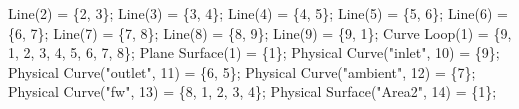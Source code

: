 \documentclass[11pt]{article}
\newenvironment{Shaded}{}{}
\newcommand{\DecValTok}[1]{\textcolor[rgb]{0.25,0.63,0.44}{{#1}}}
\newcommand{\StringTok}[1]{\textcolor[rgb]{0.25,0.44,0.63}{{#1}}}
\newcommand{\NormalTok}[1]{{#1}}
\newcommand{\OperatorTok}[1]{\textcolor[rgb]{0.40,0.40,0.40}{{#1}}}
\begin{document}
\begin{Shaded}
\begin{Highlighting}[]
\NormalTok{Line}\OperatorTok{(}\DecValTok{2}\OperatorTok{)} \OperatorTok{=} \OperatorTok{\{}\DecValTok{2}\OperatorTok{,} \DecValTok{3}\OperatorTok{\};}
\NormalTok{Line}\OperatorTok{(}\DecValTok{3}\OperatorTok{)} \OperatorTok{=} \OperatorTok{\{}\DecValTok{3}\OperatorTok{,} \DecValTok{4}\OperatorTok{\};}
\NormalTok{Line}\OperatorTok{(}\DecValTok{4}\OperatorTok{)} \OperatorTok{=} \OperatorTok{\{}\DecValTok{4}\OperatorTok{,} \DecValTok{5}\OperatorTok{\};}
\NormalTok{Line}\OperatorTok{(}\DecValTok{5}\OperatorTok{)} \OperatorTok{=} \OperatorTok{\{}\DecValTok{5}\OperatorTok{,} \DecValTok{6}\OperatorTok{\};}
\NormalTok{Line}\OperatorTok{(}\DecValTok{6}\OperatorTok{)} \OperatorTok{=} \OperatorTok{\{}\DecValTok{6}\OperatorTok{,} \DecValTok{7}\OperatorTok{\};}
\NormalTok{Line}\OperatorTok{(}\DecValTok{7}\OperatorTok{)} \OperatorTok{=} \OperatorTok{\{}\DecValTok{7}\OperatorTok{,} \DecValTok{8}\OperatorTok{\};}
\NormalTok{Line}\OperatorTok{(}\DecValTok{8}\OperatorTok{)} \OperatorTok{=} \OperatorTok{\{}\DecValTok{8}\OperatorTok{,} \DecValTok{9}\OperatorTok{\};}
\NormalTok{Line}\OperatorTok{(}\DecValTok{9}\OperatorTok{)} \OperatorTok{=} \OperatorTok{\{}\DecValTok{9}\OperatorTok{,} \DecValTok{1}\OperatorTok{\};}
\NormalTok{Curve Loop}\OperatorTok{(}\DecValTok{1}\OperatorTok{)} \OperatorTok{=} \OperatorTok{\{}\DecValTok{9}\OperatorTok{,} \DecValTok{1}\OperatorTok{,} \DecValTok{2}\OperatorTok{,} \DecValTok{3}\OperatorTok{,} \DecValTok{4}\OperatorTok{,} \DecValTok{5}\OperatorTok{,} \DecValTok{6}\OperatorTok{,} \DecValTok{7}\OperatorTok{,} \DecValTok{8}\OperatorTok{\};}
\NormalTok{Plane Surface}\OperatorTok{(}\DecValTok{1}\OperatorTok{)} \OperatorTok{=} \OperatorTok{\{}\DecValTok{1}\OperatorTok{\};}
\NormalTok{Physical Curve}\OperatorTok{(}\StringTok{"inlet"}\OperatorTok{,} \DecValTok{10}\OperatorTok{)} \OperatorTok{=} \OperatorTok{\{}\DecValTok{9}\OperatorTok{\};}
\NormalTok{Physical Curve}\OperatorTok{(}\StringTok{"outlet"}\OperatorTok{,} \DecValTok{11}\OperatorTok{)} \OperatorTok{=} \OperatorTok{\{}\DecValTok{6}\OperatorTok{,} \DecValTok{5}\OperatorTok{\};}
\NormalTok{Physical Curve}\OperatorTok{(}\StringTok{"ambient"}\OperatorTok{,} \DecValTok{12}\OperatorTok{)} \OperatorTok{=} \OperatorTok{\{}\DecValTok{7}\OperatorTok{\};}
\NormalTok{Physical Curve}\OperatorTok{(}\StringTok{"fw"}\OperatorTok{,} \DecValTok{13}\OperatorTok{)} \OperatorTok{=} \OperatorTok{\{}\DecValTok{8}\OperatorTok{,} \DecValTok{1}\OperatorTok{,} \DecValTok{2}\OperatorTok{,} \DecValTok{3}\OperatorTok{,} \DecValTok{4}\OperatorTok{\};}
\NormalTok{Physical Surface}\OperatorTok{(}\StringTok{"Area2"}\OperatorTok{,} \DecValTok{14}\OperatorTok{)} \OperatorTok{=} \OperatorTok{\{}\DecValTok{1}\OperatorTok{\};}

\end{Highlighting}
\end{Shaded}
\end{document}
